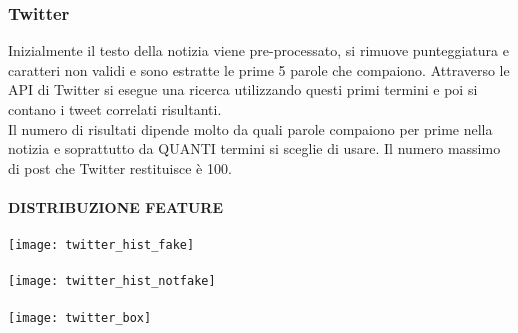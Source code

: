 \documentclass{article}
\begin{document}
\begin{multicols}{2}
				\subsubsection{Twitter}
				Inizialmente il testo della notizia viene pre-processato, si rimuove punteggiatura e caratteri non validi e sono estratte le prime 5 parole che compaiono. Attraverso le API di Twitter si esegue una ricerca utilizzando questi primi termini e poi si contano i tweet correlati risultanti.\\
				Il numero di risultati dipende molto da quali parole compaiono per prime nella notizia e soprattutto da QUANTI termini si sceglie di usare. Il numero massimo di post che Twitter restituisce è 100.
				\\~\\
				\textbf{DISTRIBUZIONE FEATURE}	
				\\~\\
				\texttt{[image: twitter\_hist\_fake]}
				\\~\\
				\texttt{[image: twitter\_hist\_notfake]}
				\\~\\
				\texttt{[image: twitter\_box]}
				\\~\\
				

\end{multicols}
\end{document}
